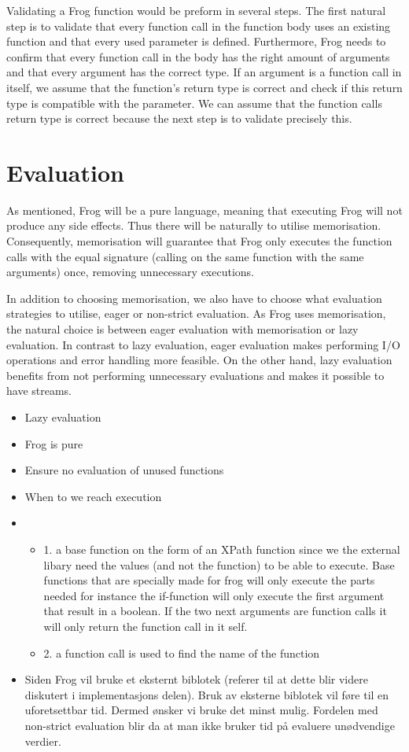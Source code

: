 \para
Validating a Frog function would be preform in several steps. The first natural step is to validate that every function call in the function body uses an existing function and that every used parameter is defined. Furthermore, Frog needs to confirm that every function call in the body has the right amount of arguments and that every argument has the correct type. If an argument is a function call in itself, we assume that the function's return type is correct and check if this return type is compatible with the parameter. We can assume that the function calls return type is correct because the next step is to validate precisely this. 

\section{Evaluation}
As mentioned, Frog will be a pure language, meaning that executing Frog will not produce any side effects. Thus there will be naturally to utilise memorisation. Consequently, memorisation will guarantee that Frog only executes the function calls with the equal signature (calling on the same function with the same arguments) once, removing unnecessary executions. 

\para
In addition to choosing memorisation, we also have to choose what evaluation strategies to utilise, eager or non-strict evaluation. As Frog uses memorisation, the natural choice is between eager evaluation with memorisation or lazy evaluation. In contrast to lazy evaluation, eager evaluation makes performing I/O operations and error handling more feasible. On the other hand, lazy evaluation benefits from not performing unnecessary evaluations and makes it possible to have streams. 
\begin{itemize}
    \item Lazy evaluation
    \item Frog is pure 
    \item Ensure no evaluation of unused functions 
    \item When to we reach execution 
    \item \begin{itemize}
        \item 1. a base function on the form of an XPath function since we the external libary need the values (and not the function) to be able to execute. Base functions that are specially made for frog will only execute the parts needed for instance the if-function will only execute the first argument that result in a boolean. If the two next arguments are function calls it will only return the function call in it self.
        \item 2. a function call is used to find the name of the function 
    \end{itemize}
    \item Siden Frog vil bruke et eksternt biblotek (referer til at dette blir videre diskutert i implementasjons delen). Bruk av eksterne biblotek vil føre til en uforetsettbar tid. Dermed ønsker vi bruke det minst mulig. Fordelen med non-strict evaluation blir da at man ikke bruker tid på evaluere unødvendige verdier. 
\end{itemize}

